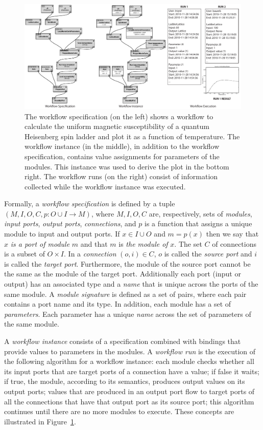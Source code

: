 \documentclass[12pt]{iopart}
\begin{document}
\begin{figure}[t]
\includegraphics[width=\linewidth]{figures/alps_provenance_types.pdf}
\caption{The workflow specification (on the left) shows a workflow to calculate the uniform magnetic susceptibility of a quantum Heisenberg spin ladder and plot it as a function of temperature.
 The workflow
 instance (in the middle), in addition to the workflow specification,
 contains value assignments for parameters of the modules. This
 instance was used to derive the plot in the bottom right. The
 workflow runs (on the right) consist of information collected while
 the workflow instance was executed. }
\vspace{0cm}
\label{fig:workflow-spec-run}
\end{figure}

Formally, a \emph{workflow specification} is defined by a tuple
$(M,I,O,C,p:O \cup I \rightarrow M)$, where $M, I, O, C$ are,
respectively, sets of {\it modules}, {\it input ports}, {\it output
 ports}, {\it connections}, and $p$ is a function that assigns a
unique module to input and output ports. If $x \in I \cup O$ and $m =
p(x)$ then we say that $x$ {\it is a port of module} $m$ and that $m$
is {\it the module of} $x$. The set $C$ of connections is a subset of
$O \times I$. In a {\it connection} $(o,i) \in C$, $o$ is called the
{\it source port} and $i$ is called the {\it target
 port}. Furthermore, the module of the source port cannot be the same
as the module of the target port. Additionally each port (input
or output) has an associated type and a {\it name} that is unique
across the ports of the same module. A {\it module signature} is
defined as a set of pairs, where each pair contains a port name and
its type. In addition, each module has a set of {\it parameters}. Each parameter
has a unique {\it name} across the set of parameters of the same
module.

A \emph{workflow instance} consists of a specification combined with
bindings that provide values to parameters in the modules. A {\it
 workflow run} is the execution of the following algorithm for a
workflow instance: each module checks whether all its input ports that
are target ports of a connection have a value; if false it waits; if
true, the module, according to its semantics, produces output values
on its output ports; values that are produced in an output port flow
to target ports of all the connections that have that output port as
its source port; this algorithm continues until there are no more
modules to execute.
%
These concepts are illustrated in Figure~\ref{fig:workflow-spec-run}.
\end{document}
